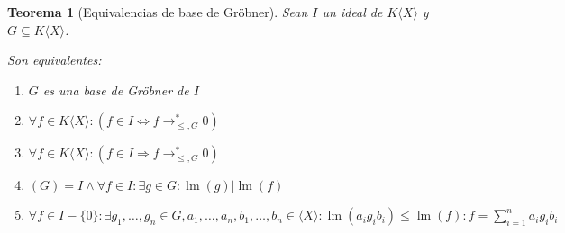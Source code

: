 \documentclass{amsbook} %
\theoremstyle{customstyle}
\newtheorem{theorem}{Teorema}[section]
\DeclareMathOperator{\lm}{lm}
\begin{document}
\begin{theorem}[Equivalencias de base de Gröbner]\label{thm:equivalencias de base de Gröbner}
Sean $I$ un ideal de $K⟨X⟩$ y $G ⊆ K⟨X⟩$.

Son equivalentes:
\begin{enumerate}
\item $G$ es una base de Gröbner de $I$

\item $∀f ∈ K⟨X⟩ : (f ∈ I ⇔ f →^*_{≤, G} 0)$

\item $∀f ∈ K⟨X⟩ : (f ∈ I ⇒ f →^*_{≤, G} 0)$

\item $(G) = I ∧ ∀f ∈ I : ∃g ∈ G : \lm(g) | \lm(f)$

\item $∀f ∈ I - \{0\} : ∃g_1, …, g_n ∈ G, a_1, …, a_n, b_1, …, b_n ∈ ⟨X⟩ : \lm(a_i g_i b_i) ≤ \lm(f) : f = ∑_{i = 1}^n a_i g_i b_i$
\end{enumerate}

\end{theorem}
\end{document}
